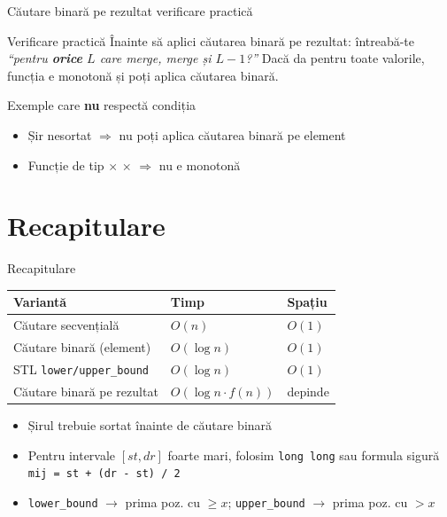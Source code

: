 \documentclass{beamer}
\begin{document}
\begin{frame}{Căutare binară pe rezultat \textemdash{} verificare practică}
  \begin{block}{Verificare practică}
    Înainte să aplici căutarea binară pe rezultat: întreabă-te \emph{``pentru \textbf{orice} $L$ care merge, merge și $L-1$?''}
    Dacă da pentru toate valorile, funcția e monotonă și poți aplica căutarea binară.
  \end{block}

  \smallskip
  \begin{block}{Exemple care \textbf{nu} respectă condiția}
    \begin{itemize}
      \item Șir nesortat $\Rightarrow$ nu poți aplica căutarea binară pe element
      \item Funcție de tip \checkmark $\times$ \checkmark $\times$ \checkmark $\Rightarrow$ nu e monotonă
    \end{itemize}
  \end{block}
\end{frame}

\section{Recapitulare}

\begin{frame}{Recapitulare}
  \begin{center}
  \begin{tabular}{lll}
    \toprule
    Variantă & Timp & Spațiu \\
    \midrule
    Căutare secvențială              & $O(n)$      & $O(1)$ \\
    Căutare binară (element)         & $O(\log n)$ & $O(1)$ \\
    STL \texttt{lower/upper\_bound}  & $O(\log n)$ & $O(1)$ \\
    Căutare binară pe rezultat     & $O(\log n \cdot f(n))$ & depinde \\ 
    \bottomrule
  \end{tabular}
  \end{center}

  \smallskip
  \begin{itemize}
    \item Șirul trebuie sortat înainte de căutare binară
    \item Pentru intervale $[st, dr]$ foarte mari, folosim \lstinline|long long| sau formula sigură \lstinline[keepspaces=true]|mij = st + (dr - st) / 2|
    \item \texttt{lower\_bound} $\rightarrow$ prima poz. cu $\geq x$; \texttt{upper\_bound} $\rightarrow$ prima poz. cu $> x$
  \end{itemize}
\end{frame}
\end{document}
